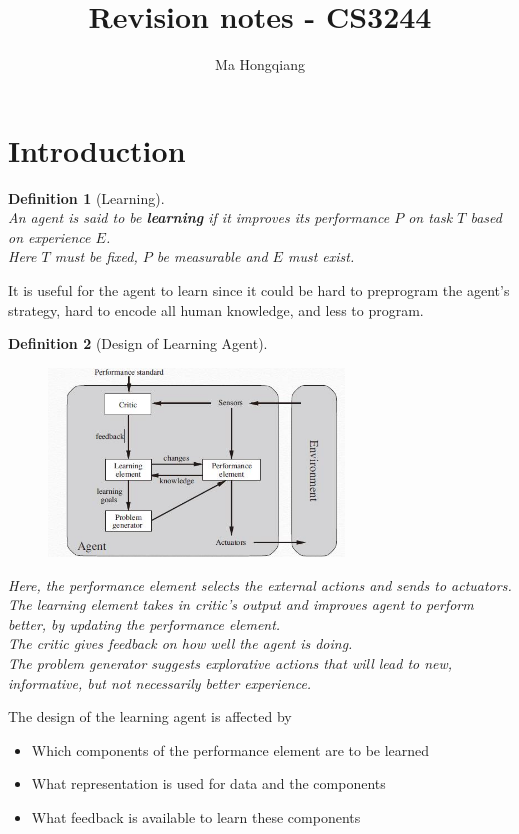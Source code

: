 \documentclass[12pt]{article}
\newtheorem{definition}{Definition}[section]
\theoremstyle{definition}
\begin{document}
\title{Revision notes - CS3244}
\author{Ma Hongqiang}
\maketitle
\tableofcontents

\clearpage
\section{Introduction}
\begin{definition}[Learning]
\hfill\\\normalfont
An agent is said to be \textbf{learning} if it improves its performance $P$ on task $T$ based on experience $E$.\\
Here $T$ must be fixed, $P$ be measurable and $E$ must exist.
\end{definition}
It is useful for the agent to learn since it could be hard to preprogram the agent's strategy, hard to encode all human knowledge, and less to program.
\begin{definition}[Design of Learning Agent]
\hfill\\\normalfont \begin{figure}[h]
\centering
\includegraphics[width=0.7\textwidth]{1-1.jpg}
\end{figure}
Here, the performance element selects the external actions and sends to actuators.\\
The learning element takes in critic's output and improves agent to perform better, by updating the performance element.\\
The critic gives feedback on how well the agent is doing.\\
The problem generator suggests explorative actions that will lead to new, informative, but not necessarily better experience.
\end{definition}
The design of the learning agent is affected by
\begin{itemize}
	\item Which components of the performance element are to be learned
	\item What representation is used for data and the components
	\item What feedback is available to learn these components
\end{itemize}
\end{document}
